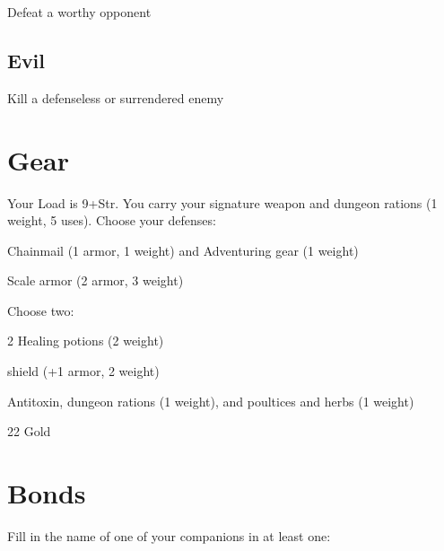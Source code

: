 Defeat a worthy opponent

         
\subsection{Evil}   
         

Kill a defenseless or surrendered enemy

       

       
\section{Gear}   
       

         

Your Load is 9+Str. You carry your signature weapon and dungeon rations (1 weight, 5 uses). Choose your defenses:

         
\startitemize[1,packed]
           
\item Chainmail (1 armor, 1 weight) and Adventuring gear (1 weight)

           
\item Scale armor (2 armor, 3 weight)

         
\stopitemize
         

Choose two:

         
\startitemize[1,packed]
           
\item 2 Healing potions (2 weight)

           
\item shield (+1 armor, 2 weight)

           
\item Antitoxin, dungeon rations (1 weight), and poultices and herbs (1 weight)

           
\item 22 Gold

         
\stopitemize
       

       
\section{Bonds}   
       

         

Fill in the name of one of your companions in at least one:

         


